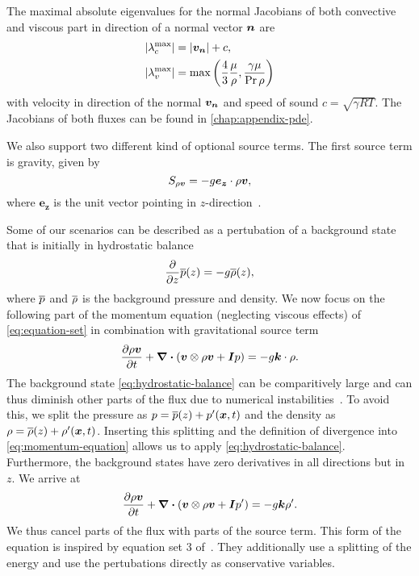The maximal absolute eigenvalues for the normal Jacobians of both convective and viscous part in direction of a normal vector $\bm{n}$ are
\begin{align}
  \begin{split}
    \maxConvEigen &=  \vert \Qv_{\normal} \vert + c,\\
    \maxViscEigen &= \max \left( \frac{4}{3} \frac{\mu}{\Qrho},
                        \frac{\gamma \mu}{\Pr \Qrho}\right)
  \end{split}
\end{align}
with velocity in direction of the normal $\bm{v}_{\bm{n}}$ and speed of sound $c = \sqrt{\gamma R T }$.
The Jacobians of both fluxes can be found in \cref{chap:appendix-pde}.

We also support two different kind of optional source terms.
The first source term is gravity, given by
\begin{equation}\label{eq:source-gravity}
  \source[\Qj] = - g \bm{e_z} \cdot \Qj,
\end{equation}
where $\bm{e_z}$ is the unit vector pointing in $z$-direction~\cite{giraldo2008study}.

\newcommand{\backgroundPressure}{\overline{\pressure}}
\newcommand{\backgroundRho}{\overline{\Qrho}}
Some of our scenarios can be described as a pertubation of a background state that is initially in hydrostatic balance
\begin{equation}
  \label{eq:hydrostatic-balance}
  \pdv{}{z} \backgroundPressure{\left (z \right )} = -g \backgroundRho(z),
\end{equation}
where $\backgroundPressure$ and $\backgroundRho$ is the background pressure and density.
We now focus on the following part of the momentum equation (neglecting viscous effects) of \cref{eq:equation-set} in combination with gravitational source term~
\begin{equation}
  \label{eq:momentum-equation}
  \pdv{\Qj}{t}+ \divergence{ \left(
    \Qv \otimes \Qj + \bm{I} \pressure
    \right)
  }
  =
  -g \bm{k} \cdot \Qrho.
\end{equation}
The background state \cref{eq:hydrostatic-balance} can be comparitively large and can thus diminish other parts of the flux due to numerical instabilities~\cite{muller2010adaptive}.
To avoid this, we split the pressure as $\pressure = \backgroundPressure(z) + \pressure' (\bm{x}, t)$ and the density as $\Qrho = \backgroundRho(z) + \Qrho'(\bm{x}, t)$.
Inserting this splitting and the definition of divergence into \cref{eq:momentum-equation} allows us to apply \cref{eq:hydrostatic-balance}.
Furthermore, the background states have zero derivatives in all directions but in $z$.
We arrive at 
\begin{equation}
  \label{eq:momentum-equation-split}
  \pdv{\Qj}{t}+ \divergence{ \left(
    \Qv \otimes \Qj + \bm{I} \pressure'
    \right)
  }
  =
  -g \bm{k} \Qrho'.
\end{equation}
We thus cancel parts of the flux with parts of the source term.
This form of the equation is inspired by equation set 3 of~\cite{giraldo2008study}.
They additionally use a splitting of the energy and use the pertubations directly as conservative variables.

